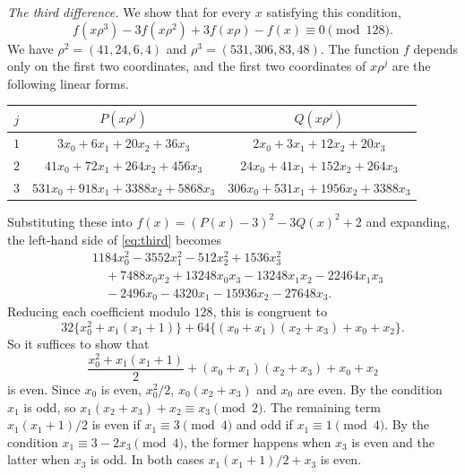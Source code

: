 \documentclass[a4paper,11pt]{article}
\theoremstyle{plain}
\theoremstyle{definition}
\theoremstyle{remark}
\numberwithin{equation}{section}
\numberwithin{table}{section}
\begin{document}
\emph{The third difference.} We show that for every $x$ satisfying this condition,
\begin{equation}\label{eq:third}
f(x\rho^3)-3f(x\rho^2)+3f(x\rho)-f(x)\equiv0\pmod{128}.
\end{equation}
We have $\rho^2=(41,24,6,4)$ and $\rho^3=(531,306,83,48)$. The function $f$ depends only on the first two coordinates, and the first two coordinates of $x\rho^j$ are the following linear forms.
\begin{center}
\small
\begin{tabular}{ccc}
\toprule
$j$ & $P(x\rho^j)$ & $Q(x\rho^j)$\\
\midrule
$1$ & $3x_0+6x_1+20x_2+36x_3$ & $2x_0+3x_1+12x_2+20x_3$\\
$2$ & $41x_0+72x_1+264x_2+456x_3$ & $24x_0+41x_1+152x_2+264x_3$\\
$3$ & $531x_0+918x_1+3388x_2+5868x_3$ & $306x_0+531x_1+1956x_2+3388x_3$\\
\bottomrule
\end{tabular}
\end{center}
Substituting these into $f(x)=(P(x)-3)^2-3Q(x)^2+2$ and expanding, the left-hand side of \eqref{eq:third} becomes
\[
\begin{aligned}
&1184x_0^2-3552x_1^2-512x_2^2+1536x_3^2\\
&\quad+7488x_0x_2+13248x_0x_3-13248x_1x_2-22464x_1x_3\\
&\quad-2496x_0-4320x_1-15936x_2-27648x_3.
\end{aligned}
\]
Reducing each coefficient modulo $128$, this is congruent to
\[
32\bigl\{x_0^2+x_1(x_1+1)\bigr\}+64\bigl\{(x_0+x_1)(x_2+x_3)+x_0+x_2\bigr\}.
\]
So it suffices to show that
\[
\frac{x_0^2+x_1(x_1+1)}2+(x_0+x_1)(x_2+x_3)+x_0+x_2
\]
is even. Since $x_0$ is even, $x_0^2/2$, $x_0(x_2+x_3)$ and $x_0$ are even. By the condition $x_1$ is odd, so $x_1(x_2+x_3)+x_2\equiv x_3\pmod2$.
The remaining term $x_1(x_1+1)/2$ is even if $x_1\equiv3\pmod4$ and odd if $x_1\equiv1\pmod4$. By the condition $x_1\equiv3-2x_3\pmod4$, the former happens when $x_3$ is even and the latter when $x_3$ is odd. In both cases $x_1(x_1+1)/2+x_3$ is even.
\end{document}
